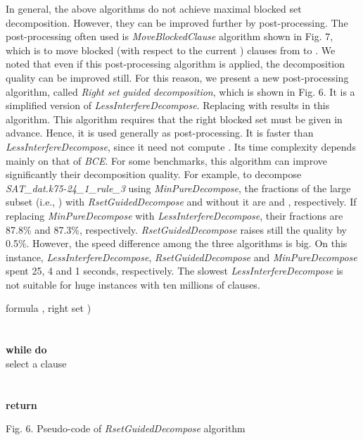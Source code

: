\documentclass{llncs}
\begin{document}
 In general, the above
algorithms do not achieve maximal blocked set decomposition.
However, they can be improved further by post-processing. The
post-processing often used is \emph{MoveBlockedClause} algorithm
shown in Fig. 7, which is to move blocked (with respect to the
current ) clauses from  to . We noted that even if this
post-processing algorithm is applied, the decomposition quality can
be improved still. For this reason, we present a new post-processing
algorithm, called \emph{Right set guided decomposition}, which is
shown in Fig. 6.  It is a simplified version of
\emph{LessInterfereDecompose}. Replacing  with  results in
this algorithm. This algorithm requires that the right blocked  set
 must be given in advance. Hence, it is used generally as
post-processing.  It is faster than \emph{LessInterfereDecompose},
since it need not compute . Its time complexity depends mainly
on that of \emph{BCE}. For some benchmarks, this algorithm can
improve significantly their decomposition quality. For example, to
decompose \emph{SAT\_dat.k75-24\_1\_rule\_3} using
\emph{MinPureDecompose}, the fractions of the large subset (i.e.,
) with \emph{RsetGuidedDecompose} and without it
are  and , respectively. If replacing
\emph{MinPureDecompose} with \emph{LessInterfereDecompose}, their
fractions are 87.8\% and 87.3\%, respectively.
\emph{RsetGuidedDecompose} raises still the quality by 0.5\%.
However, the speed difference among the three algorithms is big. On
this instance, \emph{LessInterfereDecompose},
\emph{RsetGuidedDecompose} and \emph{MinPureDecompose} spent 25, 4
and 1 seconds, respectively. The slowest
\emph{LessInterfereDecompose} is not suitable for huge instances
with ten millions of clauses.

\begin{flushleft}
\begin{sf}
\begin{footnotesize}

\hskip 12mm formula , right set )\\
\hskip 16mm \\
\hskip 16mm \\
\hskip 16mm {\bf while }  {\bf do}\\
\hskip 20mm    select a clause \\
\hskip 20mm    \\
\hskip 20mm    \\
\hskip 16mm {\bf return} 

\vspace{1em}

\hskip 8mm \textrm{Fig. 6. Pseudo-code of \emph{RsetGuidedDecompose}
algorithm}
\end{footnotesize}
\end{sf}
\end{flushleft}
\end{document}
